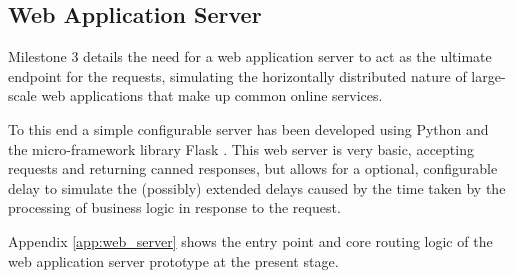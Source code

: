 \subsection{Web Application Server} %
Milestone 3 details the need for a web application server to act as the ultimate endpoint for the requests, simulating the horizontally distributed nature of large-scale web applications that make up common online services.

To this end a simple configurable server has been developed using Python and the micro-framework library Flask \cite{flask}. This web server is very basic, accepting requests and returning canned responses, but allows for a optional, configurable delay to simulate the (possibly) extended delays caused by the time taken by the processing of business logic in response to the request.

Appendix \ref{app:web_server} shows the entry point and core routing logic of the web application server prototype at the present stage.
